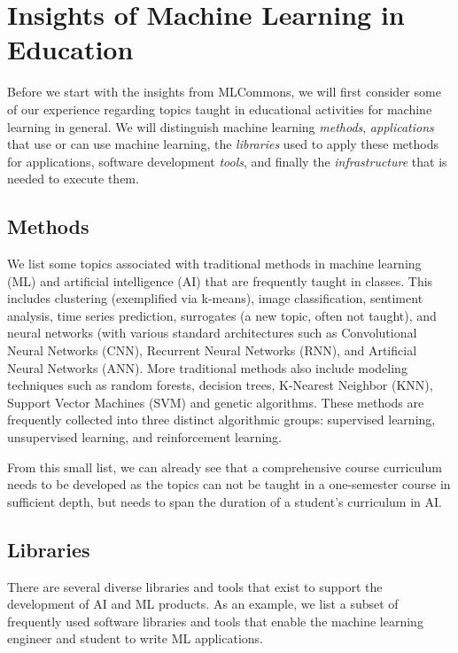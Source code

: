 \documentclass[utf8]{FrontiersinVancouver} %
\begin{document}
\section{Insights of Machine Learning in Education}
\label{sec:edu-ml}

Before we start with the insights from MLCommons, we will first
consider some of our experience regarding topics taught in educational
activities for machine learning in general. We will distinguish machine
learning {\em methods}, {\em applications} that use or can use machine
learning, the {\em libraries} used to apply these methods for
applications, software development {\em tools}, and finally the
{\em infrastructure} that is needed to execute them.


\subsection{Methods}

We list some topics associated with traditional methods in machine
learning (ML) and artificial intelligence (AI) that are frequently  taught in
classes. This includes clustering (exemplified via k-means), image
classification, sentiment analysis, time series prediction, surrogates
(a new topic, often not taught), and neural networks (with
various standard architectures such as Convolutional Neural Networks (CNN),
Recurrent Neural Networks (RNN), and Artificial Neural Networks (ANN).
More traditional methods also include modeling techniques such as random
forests, decision trees, K-Nearest Neighbor (KNN), Support Vector Machines
(SVM) and genetic algorithms.  These methods are frequently collected into
three distinct algorithmic groups: supervised learning, unsupervised
learning, and reinforcement learning.

From this small list, we can already see that a comprehensive course curriculum needs to be developed as the topics can not be taught in a one-semester course in sufficient depth, but needs to span the duration of a student's curriculum in AI.

\subsection{Libraries}

There are several diverse libraries and tools that exist to support the
development of AI and ML products.  As an example, we list a subset
of frequently used software libraries and tools that enable the
machine learning engineer and student to write ML applications.
\end{document}
